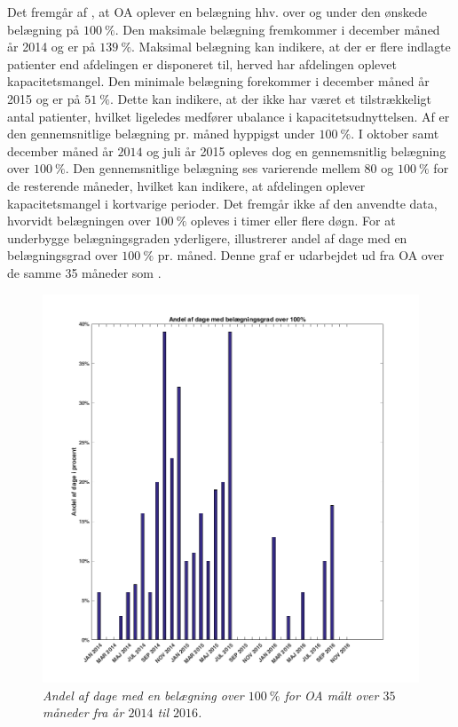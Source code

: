 \noindent
Det fremgår af , at OA oplever en belægning hhv. over og under den ønskede belægning på $100~\%$. Den maksimale belægning fremkommer i december måned år 2014 og er på $139~\%$. Maksimal belægning kan indikere, at der er flere indlagte patienter end afdelingen er disponeret til, herved har afdelingen oplevet kapacitetsmangel. Den minimale belægning forekommer i december måned år 2015 og er på $51~\%$. Dette kan indikere, at der ikke har været et tilstrækkeligt antal patienter, hvilket ligeledes medfører ubalance i kapacitetsudnyttelsen. Af  er den gennemsnitlige belægning pr. måned hyppigst under $100~\%$. I oktober samt december måned år $2014$ og juli år 2015 opleves dog en gennemsnitlig belægning over $100~\%$. Den gennemsnitlige belægning ses varierende mellem $80$ og $100~\%$ for de resterende måneder, hvilket kan indikere, at afdelingen oplever kapacitetsmangel i kortvarige perioder.
Det fremgår ikke af den anvendte data, hvorvidt belægningen over $100~\%$ opleves i timer eller flere døgn.
For at underbygge belægningsgraden yderligere, illustrerer  andel af dage med en belægningsgrad over $100~\%$ pr. måned. 
Denne graf er udarbejdet ud fra OA over de samme 35 måneder som .\cite{SDS2015} 

\begin{figure}[H]
	\flushleft 
	\centering
	\includegraphics[scale=.4]{figures/andelAfDage.png}
	\flushleft
	\caption{\textit{Andel af dage med en belægning over $100~\%$ for OA målt over $35$ måneder fra år $2014$ til $2016$.}\cite{SDS2015}}
	\label{andeldage}
\end{figure}

